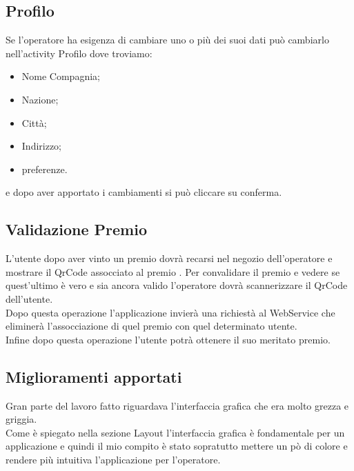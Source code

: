 \clearpage
\subsection{Profilo}
\vspace{2em}

Se l'operatore ha esigenza di cambiare uno o più dei suoi dati può cambiarlo nell'activity Profilo dove troviamo:

\begin{itemize}

\item Nome Compagnia;
\item Nazione;
\item Città;
\item Indirizzo;
\item preferenze.

\end{itemize}

e dopo aver apportato i cambiamenti si può cliccare su conferma.

\subsection{Validazione Premio}
\vspace{2em}

L'utente dopo aver vinto un premio dovrà recarsi nel negozio dell'operatore e mostrare il QrCode assocciato al premio .
Per convalidare il premio e vedere se quest'ultimo è vero e sia ancora valido l'operatore dovrà scannerizzare il QrCode dell'utente.\\
Dopo questa operazione l'applicazione invierà una richiestà al WebService che eliminerà l'assocciazione di quel premio con quel determinato utente.\\
Infine dopo questa operazione l'utente potrà ottenere il suo meritato premio.\\

\subsection{Miglioramenti apportati}
\vspace{2em}

Gran parte del lavoro fatto riguardava l'interfaccia grafica che era molto grezza e griggia.\\
Come è spiegato nella sezione Layout l'interfaccia grafica è fondamentale per un applicazione e quindi il mio compito è stato sopratutto mettere un pò di colore e rendere più intuitiva l'applicazione per l'operatore.\\

